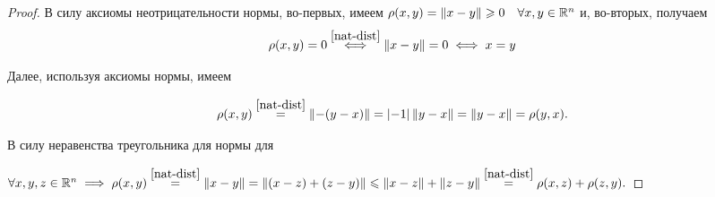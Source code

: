 \documentclass[../../main.tex]{subfiles}
\begin{document}
\begin{proof}
 В силу аксиомы неотрицательности нормы, во-первых, имеем $\rho(x, y) 
 = \lVert{x-y}\rVert \geqslant 0 \quad \forall x, y \in \mathbb{R}^n$ и, во-вторых, получаем
 \[\rho(x, y) = 0 \stackrel{\eqref{nat-dist}}{\iff} \lVert{x-y}\rVert = 0 
  \iff x = y\]
 
 Далее, используя аксиомы нормы, имеем
 
 \[\rho(x, y) \stackrel{\eqref{nat-dist}}{=} \lVert{-(y-x)}\rVert =
   \left|{-1}\right|\lVert{y-x}\rVert = \lVert{y-x}\rVert = \rho(y, x).\]
 
 В силу неравенства треугольника для нормы для
 
 $\forall x, y, z \in \R^n \implies \rho(x, y) \stk{nat-dist}{=} 
  \norm{x-y} = \norm{(x-z) + (z-y)} \le
  \norm{x-z} + \norm{z-y} \stk{nat-dist}{=} \rho(x, z) +  \rho(z, y).$
\end{proof}
\end{document}
